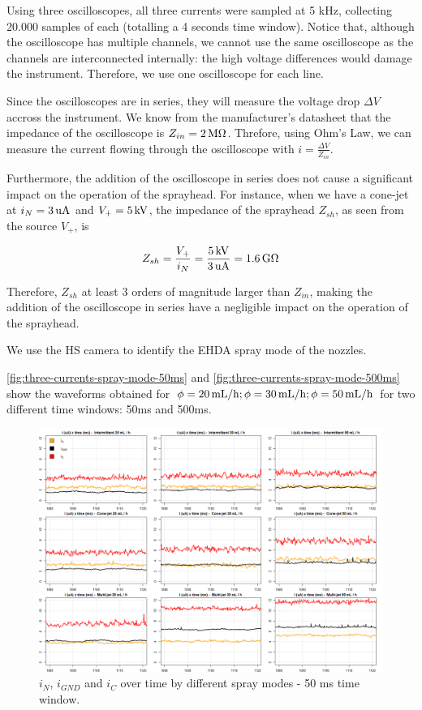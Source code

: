 \documentclass[oneside,12pt]{article}
\begin{document}
Using three oscilloscopes, all three currents were sampled at 5 kHz, collecting 20.000 samples of each
(totalling a 4 seconds time window). Notice that, although the oscilloscope has multiple channels, 
we cannot use the same oscilloscope as the channels are interconnected internally: the high voltage 
differences would damage the instrument. Therefore, we use one oscilloscope for each line. 

Since the oscilloscopes are in series, they will measure the voltage drop $\Delta V$ accross the instrument. We know from the manufacturer's 
datasheet that the impedance of the oscilloscope is $Z_{in} = 2 \,\mathrm{M} \Omega$. Threfore, using Ohm's Law, we can measure the 
current flowing through the oscilloscope with $i = \frac{\Delta V}{Z_{in}}$. 

Furthermore, the addition of the oscilloscope in series does not cause a significant impact on the operation of the sprayhead.
For instance, when we have a cone-jet at $i_N = 3 \,\mathrm{uA}$ and $V_+ = 5 \,\mathrm{kV}$, the impedance of the sprayhead $Z_{sh}$,
as seen from the source $V_+$, is

\[  Z_{sh} = \frac{V_+}{i_N} = \frac{5 \,\mathrm{kV}}{3 \,\mathrm{uA}} = 1.6 \,\mathrm{G} \Omega \]

Therefore, $Z_{sh}$ at least 3 orders of magnitude larger than $Z_{in}$, making the addition of the oscilloscope in series
have a negligible impact on the operation of the sprayhead.

We use the HS camera to identify the EHDA spray mode of the nozzles.
 
\autoref{fig:three-currents-spray-mode-50ms} and \autoref{fig:three-currents-spray-mode-500ms} show the waveforms 
obtained for $\phi = 20 \,\mathrm{mL/h}; \phi = 30 \,\mathrm{mL/h}; \phi = 50 \,\mathrm{mL/h}$ for two different time windows: 50ms 
and 500ms.

\begin{landscape}
    \begin{figure}[h!]
        \centering
        \includegraphics[width=0.75\paperheight,trim=1 1 1 1,clip]{figures/three-currents-spray-mode-50ms.png}
        \caption{$i_N$, $i_{GND}$ and $i_C$ over time by different spray modes - 50 ms time window.}
        \label{fig:three-currents-spray-mode-50ms}
    \end{figure}
\end{landscape}
\end{document}
